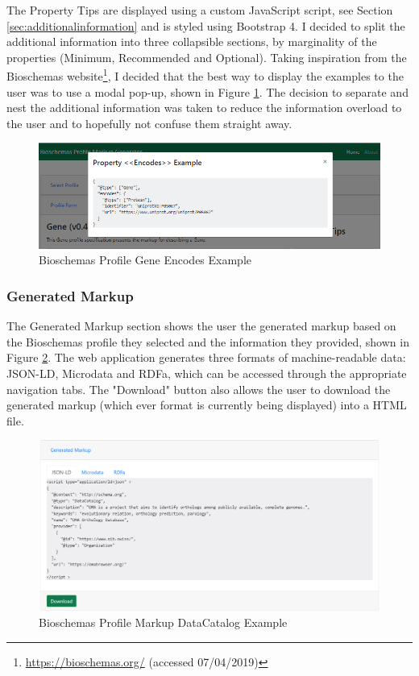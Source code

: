 {
\newpage
The Property Tips are displayed using a custom JavaScript script, see Section \ref{sec:additionalinformation} and is styled using Bootstrap 4. I decided to split the additional information into three collapsible sections, by marginality of the properties (Minimum, Recommended and Optional). Taking inspiration from the Bioschemas website\footnote{\url{https://bioschemas.org/} (accessed 07/04/2019)}, I decided that the best way to display the examples to the user was to use a modal pop-up, shown in Figure \ref{fig:geneEncodesExample}. The decision to separate and nest the additional information was taken to reduce the information overload to the user and to hopefully not confuse them straight away.\newline

\begin{figure}[!h]
 \centering\includegraphics[scale=0.42]{images/system/propertyExample.PNG}
   \caption{Bioschemas Profile Gene Encodes Example}
   \label{fig:geneEncodesExample}
\end{figure}

\subsubsection*{Generated Markup}
The Generated Markup section shows the user the generated markup based on the Bioschemas profile they selected and the information they provided, shown in Figure \ref{fig:generatedMarkup}. The web application generates three formats of machine-readable data: JSON-LD, Microdata and RDFa, which can be accessed through the appropriate navigation tabs. The "Download" button also allows the user to download the generated markup (which ever format is currently being displayed) into a HTML file.\newline

\begin{figure}[!h]
 \centering\includegraphics[scale=0.38]{images/system/GeneratedData.PNG}
   \caption{Bioschemas Profile Markup DataCatalog Example}
   \label{fig:generatedMarkup}
\end{figure}

}

